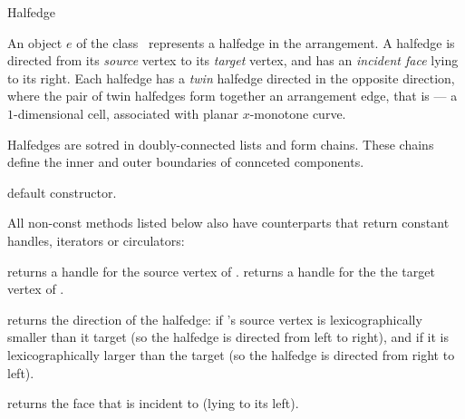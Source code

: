 
\ccRefPageBegin

\begin{ccRefClass}{Halfedge}

\ccDefinition
An object $e$ of the class \ccRefName\ represents a halfedge in the
arrangement. A halfedge is directed from its \emph{source} vertex
to its \emph{target} vertex, and has an \emph{incident face} lying to
its right. Each halfedge has a \emph{twin} halfedge directed in the
opposite direction, where the pair of twin halfedges form together
an arrangement edge, that is --- a $1$-dimensional cell, associated
with planar $x$-monotone curve.

Halfedges are sotred in doubly-connected lists and form chains. These
chains define the inner and outer boundaries of connceted components.

\ccInheritsFrom

\ccCreation
{}

   {default constructor.}    	    
    
\ccAccessFunctions

All non-const methods listed below also have  counterparts
that return constant handles, iterators or circulators:
    
    {returns a handle for the source vertex of \ccVar{}.}
\ccGlue
{}
    {returns a handle for the the target vertex of \ccVar{}.}

    {returns the direction of the halfedge:  if \ccVar{}'s
     source vertex is lexicographically smaller than it target (so the
     halfedge is directed from left to right), and  if it is
     lexicographically larger than the target (so the halfedge is directed
     from right to left).}

    {returns the face that \ccVar{} is incident to (lying to its left).}


\end{ccRefClass}

